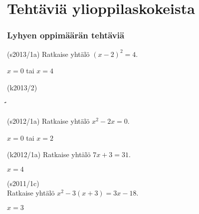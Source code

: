 \section{Tehtäviä ylioppilaskokeista}


\subsubsection*{Lyhyen oppimäärän tehtäviä}



\begin{tehtava}
(s2013/1a) Ratkaise yhtälö $(x-2)^2=4$.
\begin{vastaus}
$x=0$ tai $x=4$ 
\end{vastaus}
\end{tehtava}

\begin{tehtava}
(k2013/2)
	\begin{alakohdat}
	\end{alakohdat}
\begin{vastaus}
	\begin{alakohdat}
		\alakohta{$x>-3$}
		\alakohta{$x=-7$}
	\end{alakohdat}
\end{vastaus}
\end{tehtava}̈́

\begin{tehtava}
(s2012/1a) Ratkaise yhtälö $x^2-2x = 0$.
\begin{vastaus}
$x=0$ tai $x=2$
\end{vastaus}
\end{tehtava}

\begin{tehtava}
(k2012/1a) Ratkaise yhtälö $7x+3 = 31$.
\begin{vastaus}
$x = 4$
\end{vastaus}
\end{tehtava}

\begin{tehtava}
(s2011/1c) \\ Ratkaise yhtälö $x^2-3(x+3) = 3x-18$.
\begin{vastaus}
$x=3$
\end{vastaus}
\end{tehtava}

